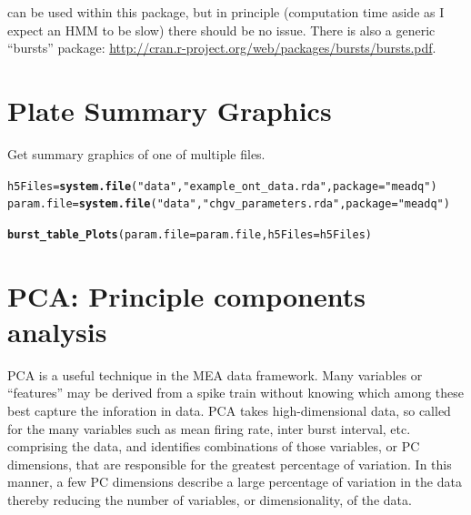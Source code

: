 \documentclass{article}\usepackage[]{graphicx}\usepackage[]{color}
\makeatletter
\newcommand{\hlstr}[1]{\textcolor[rgb]{0.192,0.494,0.8}{#1}}%
\newcommand{\hlstd}[1]{\textcolor[rgb]{0.345,0.345,0.345}{#1}}%
\newcommand{\hlkwb}[1]{\textcolor[rgb]{0.69,0.353,0.396}{#1}}%
\newcommand{\hlkwc}[1]{\textcolor[rgb]{0.333,0.667,0.333}{#1}}%
\newcommand{\hlkwd}[1]{\textcolor[rgb]{0.737,0.353,0.396}{\textbf{#1}}}%
\newenvironment{kframe}{%
 \def\at@end@of@kframe{}%
 \ifinner\ifhmode%
  \def\at@end@of@kframe{\end{minipage}}%
  \begin{minipage}{\columnwidth}%
 \fi\fi%
 \def\FrameCommand##1{\hskip\@totalleftmargin \hskip-\fboxsep
 \colorbox{shadecolor}{##1}\hskip-\fboxsep
     \hskip-\linewidth \hskip-\@totalleftmargin \hskip\columnwidth}%
 \MakeFramed {\advance\hsize-\width
   \@totalleftmargin\z@ \linewidth\hsize
   \@setminipage}}%
 {\par\unskip\endMakeFramed%
 \at@end@of@kframe}
\newenvironment{knitrout}{}{} %
\makeatother
\begin{document}
can be used within this package, but in principle (computation time
aside as I expect an HMM to be slow) there should be no issue.  There
is also a generic ``bursts'' package:
\url{http://cran.r-project.org/web/packages/bursts/bursts.pdf}.



\section*{Plate Summary Graphics}

Get summary graphics of one of multiple files.

\begin{knitrout}
\color{fgcolor}\begin{kframe}
\begin{alltt}
\hlstd{h5Files} \hlkwb{=} \hlkwd{system.file}\hlstd{(}\hlstr{"data"}\hlstd{,} \hlstr{"example_ont_data.rda"}\hlstd{,} \hlkwc{package} \hlstd{=} \hlstr{"meadq"}\hlstd{)}
\hlstd{param.file} \hlkwb{=} \hlkwd{system.file}\hlstd{(}\hlstr{"data"}\hlstd{,} \hlstr{"chgv_parameters.rda"}\hlstd{,} \hlkwc{package} \hlstd{=} \hlstr{"meadq"}\hlstd{)}

\hlkwd{burst_table_Plots}\hlstd{(}\hlkwc{param.file} \hlstd{= param.file,} \hlkwc{h5Files} \hlstd{= h5Files)}
\end{alltt}
\end{kframe}
\end{knitrout}






\section*{PCA: Principle components analysis}

PCA is a useful technique in the MEA data framework. Many variables or ``features'' may be derived from a spike train without knowing which among these best capture the inforation in data.  PCA takes high-dimensional data, so called for the many variables such as mean firing rate, inter burst interval, etc. comprising the data, and identifies combinations of those variables, or PC dimensions, that are responsible for the greatest percentage of variation.  In this manner, a few PC dimensions describe a large percentage of variation in the data thereby reducing the number of variables, or dimensionality, of the data.
\end{document}
